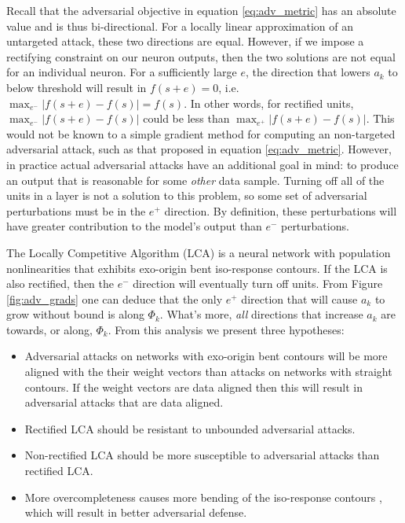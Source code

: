 Recall that the adversarial objective in equation \ref{eq:adv_metric} has an absolute value and is thus bi-directional. For a locally linear approximation of an untargeted attack, these two directions are equal. However, if we impose a rectifying constraint on our neuron outputs, then the two solutions are not equal for an individual neuron. For a sufficiently large $e$, the direction that lowers $a_{k}$ to below threshold will result in $f(s+e)=0$, i.e. $\max_{e^{-}}|f(s+e)-f(s)| = f(s)$. In other words, for rectified units, $\max_{e^{-}}|f(s+e)-f(s)|$ could be less than $\max_{e^{+}}|f(s+e)-f(s)|$. This would not be known to a simple gradient method for computing an non-targeted adversarial attack, such as that proposed in equation \ref{eq:adv_metric}. However, in practice actual adversarial attacks have an additional goal in mind: to produce an output that is reasonable for some \emph{other} data sample. Turning off all of the units in a layer is not a solution to this problem, so some set of adversarial perturbations must be in the $e^{+}$ direction. By definition, these perturbations will have greater contribution to the model's output than $e^{-}$ perturbations.

The Locally Competitive Algorithm (LCA) is a neural network with population nonlinearities that exhibits exo-origin bent iso-response contours. If the LCA is also rectified, then the $e^{-}$ direction will eventually turn off units. From Figure \ref{fig:adv_grads} one can deduce that the only $e^{+}$ direction that will cause $a_{k}$ to grow without bound is along $\Phi_{k}$. What's more, \emph{all} directions that increase $a_{k}$ are towards, or along, $\Phi_{k}$. From this analysis we present three hypotheses:

\begin{itemize}
  \item Adversarial attacks on networks with exo-origin bent contours will be more aligned with the their weight vectors than attacks on networks with straight contours. If the weight vectors are data aligned then this will result in adversarial attacks that are data aligned.
  \item Rectified LCA should be resistant to unbounded adversarial attacks.
  \item Non-rectified LCA should be more susceptible to adversarial attacks than rectified LCA.
  \item More overcompleteness causes more bending of the iso-response contours \cite{golden2016conjectures}, which will result in better adversarial defense.
\end{itemize}

